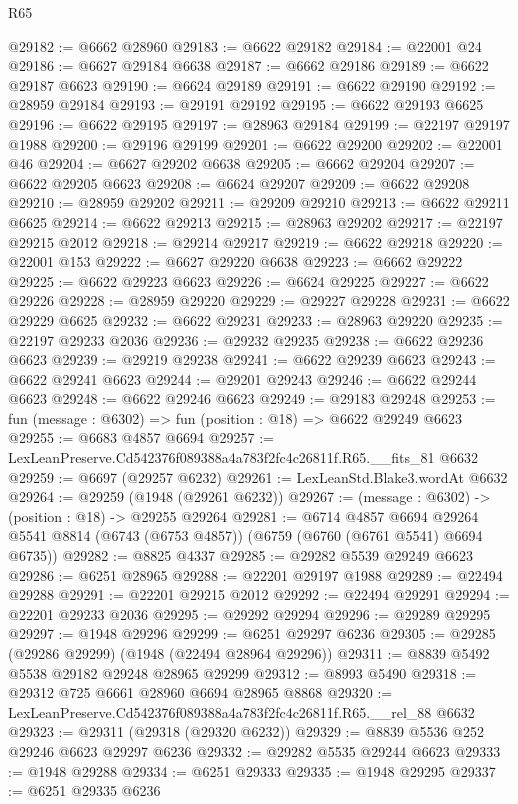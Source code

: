 \begin{lexlean}{R65}
\begin{coremodule}
{@29182 := @6662 @28960
@29183 := @6622 @29182
@29184 := @22001 @24
@29186 := @6627 @29184 @6638
@29187 := @6662 @29186
@29189 := @6622 @29187 @6623
@29190 := @6624 @29189
@29191 := @6622 @29190
@29192 := @28959 @29184
@29193 := @29191 @29192
@29195 := @6622 @29193 @6625
@29196 := @6622 @29195
@29197 := @28963 @29184
@29199 := @22197 @29197 @1988
@29200 := @29196 @29199
@29201 := @6622 @29200
@29202 := @22001 @46
@29204 := @6627 @29202 @6638
@29205 := @6662 @29204
@29207 := @6622 @29205 @6623
@29208 := @6624 @29207
@29209 := @6622 @29208
@29210 := @28959 @29202
@29211 := @29209 @29210
@29213 := @6622 @29211 @6625
@29214 := @6622 @29213
@29215 := @28963 @29202
@29217 := @22197 @29215 @2012
@29218 := @29214 @29217
@29219 := @6622 @29218
@29220 := @22001 @153
@29222 := @6627 @29220 @6638
@29223 := @6662 @29222
@29225 := @6622 @29223 @6623
@29226 := @6624 @29225
@29227 := @6622 @29226
@29228 := @28959 @29220
@29229 := @29227 @29228
@29231 := @6622 @29229 @6625
@29232 := @6622 @29231
@29233 := @28963 @29220
@29235 := @22197 @29233 @2036
@29236 := @29232 @29235
@29238 := @6622 @29236 @6623
@29239 := @29219 @29238
@29241 := @6622 @29239 @6623
@29243 := @6622 @29241 @6623
@29244 := @29201 @29243
@29246 := @6622 @29244 @6623
@29248 := @6622 @29246 @6623
@29249 := @29183 @29248
@29253 := fun (message : @6302) => fun (position : @18) => @6622 @29249 @6623
@29255 := @6683 @4857 @6694
@29257 := LexLeanPreserve.Cd542376f089388a4a783f2fc4c26811f.R65.__fits_81 @6632
@29259 := @6697 (@29257 @6232)
@29261 := LexLeanStd.Blake3.wordAt @6632
@29264 := @29259 (@1948 (@29261 @6232))
@29267 := (message : @6302) -> (position : @18) -> @29255 @29264
@29281 := @6714
    @4857
    @6694
    @29264
    @5541
    @8814
    (@6743 (@6753 @4857))
    (@6759 (@6760 (@6761 @5541) @6694 @6735))
@29282 := @8825 @4337
@29285 := @29282 @5539 @29249 @6623
@29286 := @6251 @28965
@29288 := @22201 @29197 @1988
@29289 := @22494 @29288
@29291 := @22201 @29215 @2012
@29292 := @22494 @29291
@29294 := @22201 @29233 @2036
@29295 := @29292 @29294
@29296 := @29289 @29295
@29297 := @1948 @29296
@29299 := @6251 @29297 @6236
@29305 := @29285 (@29286 @29299) (@1948 (@22494 @28964 @29296))
@29311 := @8839 @5492 @5538 @29182 @29248 @28965 @29299
@29312 := @8993 @5490
@29318 := @29312 @725 @6661 @28960 @6694 @28965 @8868
@29320 := LexLeanPreserve.Cd542376f089388a4a783f2fc4c26811f.R65.__rel_88 @6632
@29323 := @29311 (@29318 (@29320 @6232))
@29329 := @8839 @5536 @252 @29246 @6623 @29297 @6236
@29332 := @29282 @5535 @29244 @6623
@29333 := @1948 @29288
@29334 := @6251 @29333
@29335 := @1948 @29295
@29337 := @6251 @29335 @6236
}
\end{coremodule}
\end{lexlean}
